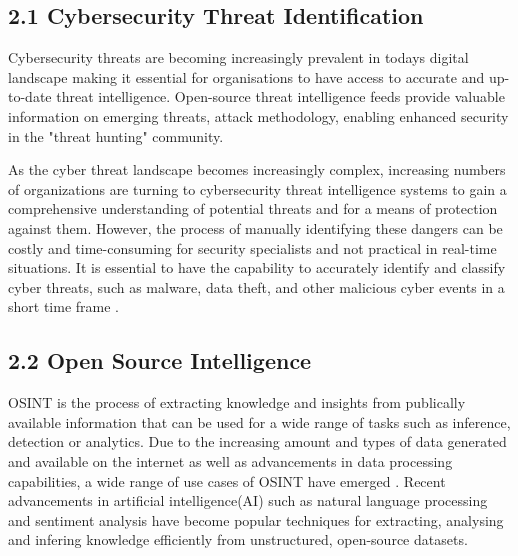 \documentclass[letterpaper,twocolumn,fleqn]{article}
\begin{document}
\subsection{2.1 Cybersecurity Threat Identification}
Cybersecurity threats are becoming increasingly prevalent in todays digital landscape making it essential for organisations to have access to accurate and up-to-date threat intelligence\cite{jang-jaccardSurveyEmergingThreats2014,daveNewFrontierCybersecurity2023}.
Open-source threat intelligence feeds provide valuable information on emerging threats, attack methodology, enabling enhanced security in the "threat hunting" community\cite{cherqiEnhancingCyberThreat2023,zhangMiningOpenSourceCyber2021}. 

As the cyber threat landscape becomes increasingly complex, increasing numbers of organizations are turning to cybersecurity threat intelligence systems to gain a comprehensive understanding of potential threats and for a means of protection against them\cite{jang-jaccardSurveyEmergingThreats2014,daveNewFrontierCybersecurity2023}. 
However, the process of manually identifying these dangers can be costly and time-consuming for security specialists and not practical in real-time situations. 
It is essential to have the capability to accurately identify and classify cyber threats, such as malware, data theft, and other malicious cyber events in a short time frame \cite{cherqiEnhancingCyberThreat2023,jang-jaccardSurveyEmergingThreats2014, daveNewFrontierCybersecurity2023}. 

\subsection{2.2 Open Source Intelligence}
OSINT is the process of extracting knowledge and insights from publically available information that can be used for a wide range of tasks such as inference, detection or analytics\cite{pastor-galindoNotExploitedGoldmine2020}.
Due to the increasing amount and types of data generated and available on the internet as well as advancements in data processing capabilities, a wide range of use cases of OSINT have emerged \cite{pastor-galindoNotExploitedGoldmine2020}. 
Recent advancements in artificial intelligence(AI) such as natural language processing and sentiment analysis have become popular techniques for extracting, analysing and infering knowledge efficiently from unstructured, open-source datasets\cite{pastor-galindoNotExploitedGoldmine2020,chenZeroShotTextClassification2022}.
\end{document}
